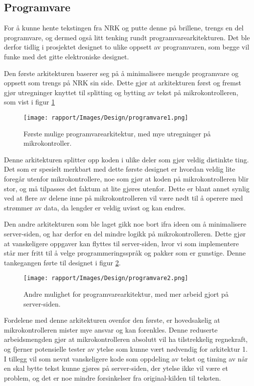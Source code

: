 \subsection{Programvare}

For å kunne hente tekstingen fra NRK og putte denne på brillene, trengs en del programvare, og dermed også litt tenking rundt programvarearkitekturen. Det ble derfor tidlig i prosjektet designet to ulike oppsett av programvaren, som begge vil funke med det gitte elektroniske designet.

Den første arkitekturen baserer seg på å minimalisere mengde programvare og oppsett som trengs på NRK sin side. Dette gjør at arkitekturen først og fremst gjør utregninger knyttet til splitting og bytting av tekst på mikrokontrolleren, som vist i figur \ref{fig:programvare1}

\begin{figure}[H]
    \centering
    \texttt{[image: rapport/Images/Design/programvare1.png]}
    \caption{Første mulige programvarearkitektur, med mye utregninger på mikrokontroller.}
    \label{fig:programvare1}
\end{figure}

Denne arkitekturen splitter opp koden i ulike deler som gjør veldig distinkte ting. Det som er spesielt merkbart med dette første designet er hvordan veldig lite foregår utenfor mikrokontrollere, noe som gjør at koden på mikrokontrolleren blir stor, og må tilpasses det faktum at lite gjøres utenfor. Dette er blant annet synlig ved at flere av delene inne på mikrokontrolleren vil være nødt til å operere med strømmer av data, da lengder er veldig uvisst og kan endres.

Den andre arkitekturen som ble laget gikk noe bort ifra ideen om å minimalisere server-siden, og har derfor en del mindre logikk på mikrokontrolleren. Dette gjør at vanskeligere oppgaver kan flyttes til server-siden, hvor vi som implementere står mer fritt til å velge programmeringsspråk og pakker som er gunstige. Denne tankegangen førte til designet i figur \ref{fig:programvare2}.

\begin{figure}[H]
    \centering
    \texttt{[image: rapport/Images/Design/programvare2.png]}
    \caption{Andre mulighet for programvarearkitektur, med mer arbeid gjort på server-siden.}
    \label{fig:programvare2}
\end{figure}

Fordelene med denne arkitekturen ovenfor den første, er hovedsakelig at mikrokontrolleren mister mye ansvar og kan forenkles. Denne reduserte arbeidsmengden gjør at mikrokontrolleren absolutt vil ha tilstrekkelig regnekraft, og fjerner potensielle tester av ytelse som kunne vært nødvendig for arkitektur 1. I tillegg vil som nevnt vanskeligere kode som oppdeling av tekst og timing av når en skal bytte tekst kunne gjøres på server-siden, der ytelse ikke vil være et problem, og det er noe mindre forsinkelser fra original-kilden til teksten.
